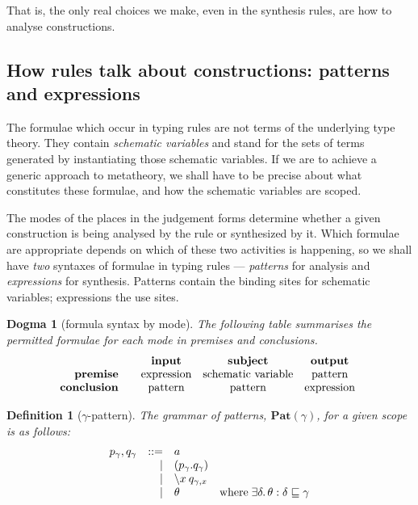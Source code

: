 \documentclass{jfp1}
\newtheorem{definition}[theorem]{Definition}
\newtheorem{dogma}[theorem]{Dogma}
\begin{document}
That is, the only real choices we make, even in the synthesis rules, are how to
analyse constructions.


\subsection{How rules talk about constructions: patterns and expressions}

The formulae which occur in typing rules are not terms of the underlying
type theory. They contain \emph{schematic variables} and stand for the sets
of terms generated by instantiating those schematic variables. If we are
to achieve a generic approach to metatheory, we shall have to be precise
about what constitutes these formulae, and how the schematic variables are
scoped.

The modes of the places in the judgement forms determine whether a given
construction is being analysed by the rule or synthesized by it. Which formulae
are appropriate depends on which of these two activities is happening, so
we shall have \emph{two} syntaxes of formulae in typing rules --- \emph{patterns}
for analysis and \emph{expressions} for synthesis. Patterns contain the
binding sites for schematic variables; expressions the use sites.

\begin{dogma}[\label{dogma:mode}formula syntax by mode]
  The following table summarises the permitted formulae for each mode in premises
  and conclusions.
  \[\mbox{\begin{tabular}{r@{~ ~}@{~ ~}c@{~ ~}c@{~ ~}c}
                    & \textbf{input} & \textbf{subject} & \textbf{output} \\
            \textbf{premise}  & expression & schematic variable & pattern \\
     \textbf{conclusion} & pattern & pattern & expression \\
          \end{tabular} }\]
\end{dogma}

\newcommand{\Pat}[1]{\textbf{Pat}(#1)}
\begin{definition}[$\gamma$-pattern]
The grammar of patterns, $\Pat\gamma$, for a given scope is as follows:
\[\begin{array}{rrl@{\quad}l}
    p_\gamma, q_\gamma & ::= & a \\
         &   | & (p_\gamma.q_\gamma) \\
         &   | & \la x q_{\gamma,x} \\
         &   | & \theta & \mbox{where}\;\exists\delta.\,\theta : \delta\thin\gamma
\end{array}\]
\end{definition}
\end{document}
